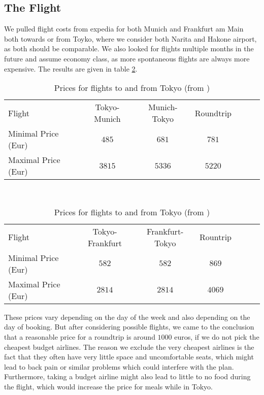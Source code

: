 \documentclass{article}
\begin{document}
\subsection{The Flight}
We pulled flight costs from expedia \cite{exp} for both Munich and Frankfurt am Main both towards or from Toyko, where we consider both Narita and Hakone airport, as both should be comparable.
We also looked for flights multiple months in the future and assume economy class, as more spontaneous flights are always more expensive.
The results are given in table \ref{tab:flight-prices}.\\
\begin{table}[h]
\centering
\begin{tabular}{l c c c c c c}
Flight              & Tokyo-Munich & Munich-Tokyo & Roundtrip \\
Minimal Price (Eur) & $485$        & $681$        & $781$              \\
Maximal Price (Eur) & $3815$       & $5336$       & $5220$             \\
\end{tabular}\\
\vspace{1em}
\begin{tabular}{l c c c c c c}
Flight              & Tokyo-Frankfurt & Frankfurt-Tokyo & Rountrip\\
Minimal Price (Eur) & $582$           & $582$           & $869$ \\
Maximal Price (Eur) & $2814$          & $2814$          & $4069$ \\
\end{tabular}

\caption{Prices for flights to and from Tokyo (from \cite{exp})}
\label{tab:flight-prices}
\end{table}

These prices vary depending on the day of the week and also depending on the day of booking.
But after considering possible flights, we came to the conclusion that a reasonable price for a roundtrip is around $1000$ euros, if we do not pick the cheapest budget airlines.
The reason we exclude the very cheapest airlines is the fact that they often have very little space and uncomfortable seats, which might lead to back pain or similar problems which could interfere with the plan.
Furthermore, taking a budget airline might also lead to little to no food during the flight, which would increase the price for meals while in Tokyo.
\end{document}
